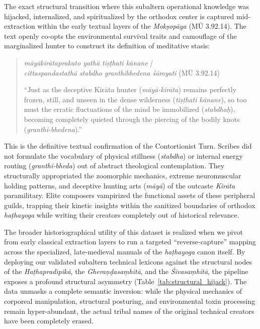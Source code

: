 \documentclass[11pt,twoside,letterpaper]{article}
\begin{document}
The exact structural transition where this subaltern operational knowledge was hijacked, internalized, and spiritualized by the orthodox center is captured mid-extraction within the early textual layers of the \textit{Mok\d{s}op\={a}ya} (M\={U} 3.92.14). The text openly co-opts the environmental survival traits and camouflage of the marginalized hunter to construct its definition of meditative stasis:

\begin{quote}
\small
\noindent\textit{m\={a}y\={a}kir\={a}taprakato yath\={a} ti\d{s}\d{t}hati k\={a}nane |} \\\noindent\textit{cittaspandastath\={a} stabdho granthibhedena \'s\={a}myati} (M\={U} 3.92.14)
\medskip

``Just as the deceptive Kir\={a}ta hunter (\textit{m\={a}y\={a}-kir\={a}ta}) remains perfectly frozen, still, and unseen in the dense wilderness (\textit{ti\d{s}\d{t}hati k\={a}nane}), so too must the erratic fluctuations of the mind be immobilized (\textit{stabdha\d{h}}), becoming completely quieted through the piercing of the bodily knots (\textit{granthi-bhedena}).''
\end{quote}

This is the definitive textual confirmation of the Contortionist Turn. Scribes did not formulate the vocabulary of physical stillness (\textit{stabdha}) or internal energy routing (\textit{granthi-bheda}) out of abstract theological contemplation. They structurally appropriated the zoomorphic mechanics, extreme neuromuscular holding patterns, and deceptive hunting arts (\textit{m\={a}y\={a}}) of the outcaste \textit{Kir\={a}ta} paramilitary. Elite composers vampirized the functional assets of these peripheral guilds, trapping their kinetic insights within the sanitized boundaries of orthodox \textit{ha\d{t}hayoga} while writing their creators completely out of historical relevance.

The broader historiographical utility of this dataset is realized when we pivot from early classical extraction layers to run a targeted ``reverse-capture'' mapping across the specialized, late-medieval manuals of the \textit{ha\d{t}hayoga} canon itself. By deploying our validated subaltern technical lexicons against the structural nodes of the \textit{Ha\d{t}haprad\={\i}pik\={a}}, the \textit{Ghera\d{n}\d{d}asa\d{m}hit\={a}}, and the \textit{\'{S}ivasa\d{m}hit\={a}}, the pipeline exposes a profound structural asymmetry (Table~\ref{tab:structural_hijack}). The data unmasks a complete semantic inversion: while the physical mechanics of corporeal manipulation, structural posturing, and environmental toxin processing remain hyper-abundant, the actual tribal names of the original technical creators have been completely erased.
\end{document}
